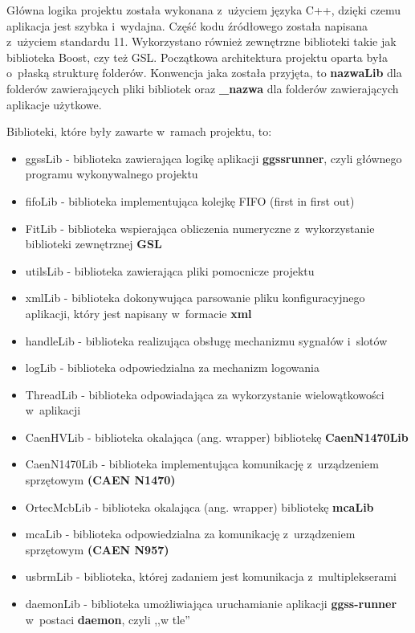 Główna logika projektu została wykonana z~użyciem języka C++, dzięki czemu aplikacja jest szybka i~wydajna. Część kodu źródłowego została napisana z~użyciem standardu 11. Wykorzystano również zewnętrzne biblioteki takie jak biblioteka Boost, czy też GSL. Początkowa architektura projektu oparta była o~płaską strukturę folderów. Konwencja jaka została przyjęta, to \textbf{nazwaLib} dla folderów zawierających pliki bibliotek oraz \textbf{\_nazwa} dla folderów zawierających aplikacje użytkowe.\par
\bigskip
Biblioteki, które były zawarte w~ramach projektu, to:
\begin{itemize}
\item ggssLib - biblioteka zawierająca logikę aplikacji \textbf{ggssrunner}, czyli głównego programu wykonywalnego projektu
\item fifoLib - biblioteka implementująca kolejkę FIFO (first in first out)
\item FitLib - biblioteka wspierająca obliczenia numeryczne z~wykorzystanie biblioteki zewnętrznej \textbf{GSL}
\item utilsLib - biblioteka zawierająca pliki pomocnicze projektu
\item xmlLib - biblioteka dokonywująca parsowanie pliku konfiguracyjnego aplikacji, który jest napisany w~formacie \textbf{xml}
\item handleLib - biblioteka realizująca obsługę mechanizmu sygnałów i~slotów
\item logLib - biblioteka odpowiedzialna za mechanizm logowania
\item ThreadLib - biblioteka odpowiadająca za wykorzystanie wielowątkowości w~aplikacji
\item CaenHVLib - biblioteka okalająca (ang. wrapper) bibliotekę \textbf{CaenN1470Lib}
\item CaenN1470Lib - biblioteka implementująca komunikację z~urządzeniem sprzętowym \textbf{(CAEN N1470)}
\item OrtecMcbLib - biblioteka okalająca (ang. wrapper) bibliotekę \textbf{mcaLib}
\item mcaLib - biblioteka odpowiedzialna za komunikację z~urządzeniem sprzętowym \textbf{(CAEN N957)}
\item usbrmLib - biblioteka, której zadaniem jest komunikacja z~multiplekserami
\item daemonLib - biblioteka umożliwiająca uruchamianie aplikacji \textbf{ggss-runner} w~postaci \textbf{daemon}, czyli ,,w tle'' 
\end{itemize}

